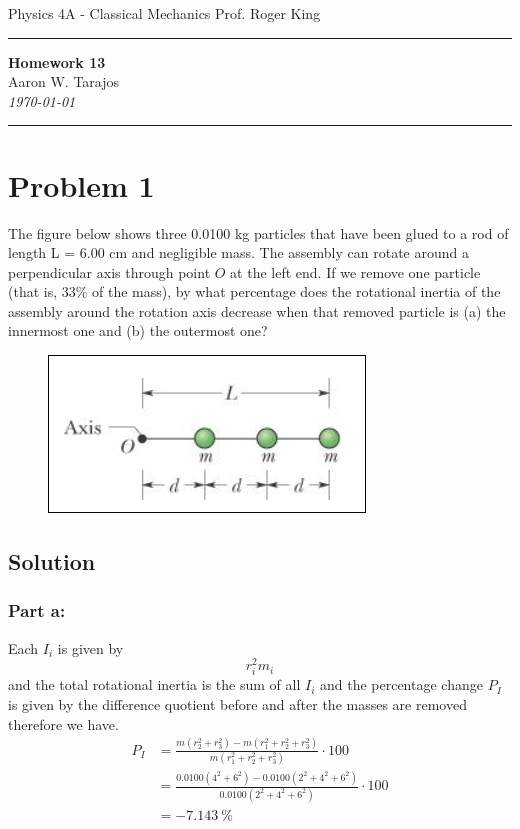 \documentclass{article}
\begin{document}
\noindent
Physics 4A - Classical Mechanics \hfill Prof. Roger King

\noindent\rule{\textwidth}{0.4pt}

\begin{center}
    \textbf{\LARGE Homework 13} \\
    \vspace{12pt}
    \large Aaron W. Tarajos \\
    \textit{\today}
\end{center}

\noindent\rule{\textwidth}{0.4pt}

\section*{Problem 1}
The figure below shows three 0.0100 kg particles that have been glued to a rod of length L = 6.00
cm and negligible mass. The assembly can rotate around a perpendicular axis through point $O$ at
the left end. If we remove one particle (that is, 33\% of the mass), by what percentage does the
rotational inertia of the assembly around the rotation axis decrease when that removed particle
is (a) the innermost one and (b) the outermost one?

\begin{figure}[ht]
    \centering
    \includegraphics[scale=0.5]{drawing-1.png}
\end{figure}

\subsection*{Solution}
\subsubsection*{Part a:}
Each $I_i$ is given by
\[
	r_i^2 m_i
\]
and the total rotational inertia is the sum of all $I_i$ and the percentage change $P_I$ is given by the difference quotient before and after the masses are removed therefore we have.
\begin{align*}
	P_I &= \frac{m(r_2^2 + r_3^2) - m(r_1^2 + r_2^2 + r_3^2)}{m(r_1^2 + r_2^2 + r_3^2)} \cdot 100\\
	    &= \frac{0.0100(4^2 + 6^2) - 0.0100(2^2 + 4^2 + 6^2)}{0.0100(2^2 + 4^2 + 6^2)} \cdot 100 \\
	    &= \boxed{-7.143\ \%}
\end{align*}
\end{document}
